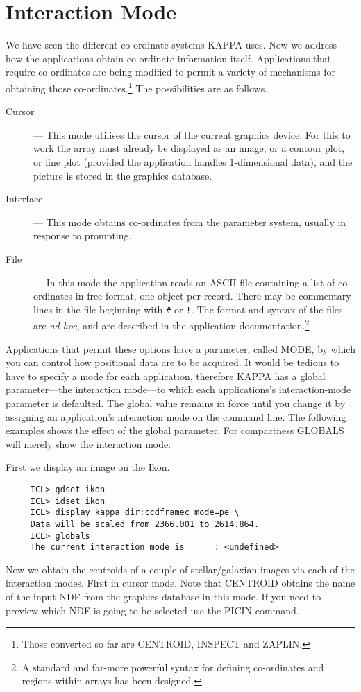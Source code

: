 {\section{Interaction Mode}
\label{se:interaction}
We have seen the different co-ordinate systems {\small KAPPA} uses.
Now we address how the applications obtain co-ordinate information
itself.  Applications that require co-ordinates are being modified to
permit a variety of mechanisms for obtaining those
co-ordinates.\footnote{Those converted so far are CENTROID, INSPECT and
ZAPLIN.} The possibilities are as follows.
\begin{description}
\item [Cursor] --- This mode utilises the cursor of the current graphics
device.  For this to work the array must already be displayed as an
image, or a contour plot, or line plot (provided the application handles
1-dimensional data), and the picture is stored in the graphics database.
\item [Interface] --- This mode obtains co-ordinates from
the parameter system, usually in response to prompting.
\item [File] --- In this mode the application reads an ASCII file
containing a list of co-ordinates in free format, one object per record.
There may be commentary lines in the file beginning with {\tt \#} or
{\tt !}.  The format and syntax of the files are {\it ad hoc}, and are
described in the application documentation.\footnote{A standard and
far-more powerful syntax for defining co-ordinates and regions within
arrays has been designed.}
\end{description}

Applications that permit these options have a parameter, called
MODE, by which you can control how positional data are to be acquired.
It would be tedious to have to specify a mode for each application,
therefore {\small KAPPA} has a global parameter---the interaction
mode---to which each applications's interaction-mode parameter is
defaulted.  The global value remains in force until you change it by
assigning an application's interaction mode on the command line.
The following examples shows the effect of the global parameter.
For compactness GLOBALS will merely show the interaction mode.

First we display an image on the Ikon.

\small
\begin{verbatim}
     ICL> gdset ikon
     ICL> idset ikon
     ICL> display kappa_dir:ccdframec mode=pe \
     Data will be scaled from 2366.001 to 2614.864.
     ICL> globals
     The current interaction mode is      : <undefined>
\end{verbatim}
\normalsize
Now we obtain the centroids of a couple of stellar/galaxian images via
each of the interaction modes.  First in cursor mode.  Note that
CENTROID obtains the name of the input NDF from the graphics database
in this mode.  If you need to preview which NDF is going to be selected
use the PICIN command.

}
